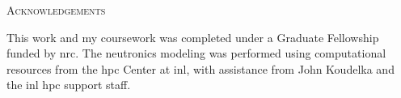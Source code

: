 \begin{center}
   {\LARGE\textsc{Acknowledgements}}

   This work and my coursework was completed under a Graduate Fellowship funded by \acf{nrc}. The neutronics modeling was performed using computational resources from the \acf{hpc} Center at \acf{inl}, with assistance from John Koudelka and the \acs{inl} \acs{hpc} support staff.
   
\end{center}

